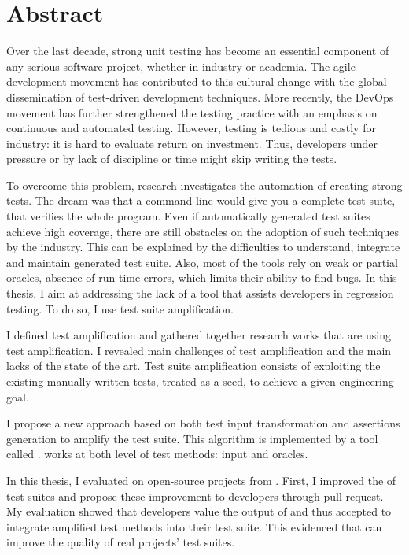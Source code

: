 \documentclass[a4paper,11pt,twoside,table]{style}
\begin{document}
\section*{Abstract}
\begin{vcenterpage}
Over the last decade, strong unit testing has become an essential component of any serious software project, whether in industry or academia.
The agile development movement has contributed to this cultural change with the global dissemination of test-driven development techniques.
More recently, the DevOps movement has further strengthened the testing practice with an emphasis on continuous and automated testing.
However, testing is tedious and costly for industry: it is hard to evaluate return on investment.
Thus, developers under pressure or by lack of discipline or time might skip writing the tests.

To overcome this problem, research investigates the automation of creating strong tests.
The dream was that a command-line would give you a complete test suite, that verifies the whole program.
Even if automatically generated test suites achieve high coverage, there are still obstacles on the adoption of such techniques by the industry.
This can be explained by the difficulties to understand, integrate and maintain generated test suite.
Also, most of the tools rely on weak or partial oracles, \eg absence of run-time errors, which limits their ability to find bugs.
In this thesis, I aim at addressing the lack of a tool that assists developers in regression testing.
To do so, I use test suite amplification.

I defined test amplification and gathered together research works that are using test amplification.
I revealed main challenges of test amplification and the main lacks of the state of the art.
Test suite amplification consists of exploiting the existing manually-written tests, treated as a seed, to achieve a given engineering goal.

I propose a new approach based on both test input transformation and assertions generation to amplify the test suite.
This algorithm is implemented by a tool called \dspot.
\dspot works at both level of test methods: input and oracles.

In this thesis, I evaluated \dspot on open-source projects from \gh.
First, I improved the \ms of test suites and propose these improvement to developers through pull-request.
My evaluation showed that developers value the output of \dspot and thus accepted to integrate amplified test methods into their test suite.
This evidenced that \dspot can improve the quality of real projects' test suites.


\end{vcenterpage}
\end{document}
